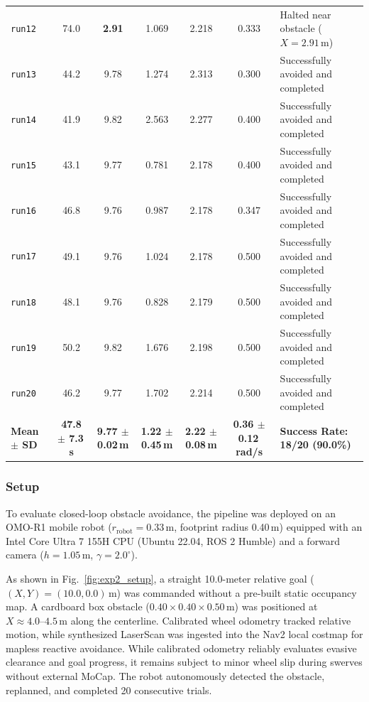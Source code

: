 \documentclass{ieeeaccess}
\begin{document}
\begin{table}[!t]
\begin{tabularx}{\textwidth}{lcccccX}
    \texttt{run12} & 74.0 & \textbf{2.91} & 1.069 & 2.218 & 0.333 & Halted near obstacle ($X=2.91$\,m) \\
    \texttt{run13} & 44.2 & 9.78 & 1.274 & 2.313 & 0.300 & Successfully avoided and completed \\
    \texttt{run14} & 41.9 & 9.82 & 2.563 & 2.277 & 0.400 & Successfully avoided and completed \\
    \texttt{run15} & 43.1 & 9.77 & 0.781 & 2.178 & 0.400 & Successfully avoided and completed \\
    \texttt{run16} & 46.8 & 9.76 & 0.987 & 2.178 & 0.347 & Successfully avoided and completed \\
    \texttt{run17} & 49.1 & 9.76 & 1.024 & 2.178 & 0.500 & Successfully avoided and completed \\
    \texttt{run18} & 48.1 & 9.76 & 0.828 & 2.179 & 0.500 & Successfully avoided and completed \\
    \texttt{run19} & 50.2 & 9.82 & 1.676 & 2.198 & 0.500 & Successfully avoided and completed \\
    \texttt{run20} & 46.2 & 9.77 & 1.702 & 2.214 & 0.500 & Successfully avoided and completed \\
    \midrule
    \textbf{Mean $\pm$ SD} & \textbf{47.8 $\pm$ 7.3\,s} & \textbf{9.77 $\pm$ 0.02\,m} & \textbf{1.22 $\pm$ 0.45\,m} & \textbf{2.22 $\pm$ 0.08\,m} & \textbf{0.36 $\pm$ 0.12\,rad/s} & \textbf{Success Rate: 18/20 (90.0\%)} \\
    \bottomrule
  \end{tabularx}
\end{table}

\subsubsection{Setup}
To evaluate closed-loop obstacle avoidance, the pipeline was deployed on an OMO-R1 mobile robot ($r_{\mathrm{robot}} = 0.33$\,m, footprint radius 0.40\,m) equipped with an Intel Core Ultra 7 155H CPU (Ubuntu 22.04, ROS 2 Humble) and a forward camera ($h=1.05$\,m, $\gamma=2.0^\circ$).

As shown in Fig.~\ref{fig:exp2_setup}, a straight 10.0-meter relative goal ($(X, Y) = (10.0, 0.0)$\,m) was commanded without a pre-built static occupancy map. A cardboard box obstacle ($0.40 \times 0.40 \times 0.50$\,m) was positioned at $X \approx 4.0\text{--}4.5$\,m along the centerline. Calibrated wheel odometry tracked relative motion, while synthesized LaserScan was ingested into the Nav2 local costmap for mapless reactive avoidance. While calibrated odometry reliably evaluates evasive clearance and goal progress, it remains subject to minor wheel slip during swerves without external MoCap. The robot autonomously detected the obstacle, replanned, and completed 20 consecutive trials.
\end{document}
